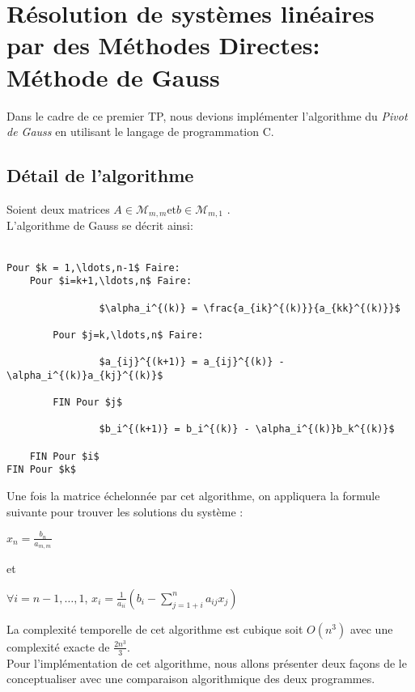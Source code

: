 \chapter{Résolution de systèmes linéaires par des Méthodes Directes: Méthode de Gauss}
Dans le cadre de ce premier TP, nous devions implémenter l'algorithme du \emph{Pivot de Gauss} en utilisant le langage de programmation C.
\section{Détail de l'algorithme}
Soient deux matrices $A \in \mathcal{M}_{m,m} \text{et} b \in \mathcal{M}_{m,1}$ . \\
L'algorithme de Gauss se décrit ainsi: \\ \\
\begin{lstlisting}[mathescape=true, frame=single]
Pour $k = 1,\ldots,n-1$ Faire:
	Pour $i=k+1,\ldots,n$ Faire:

				$\alpha_i^{(k)} = \frac{a_{ik}^{(k)}}{a_{kk}^{(k)}}$ 
		
		Pour $j=k,\ldots,n$ Faire:

		   		$a_{ij}^{(k+1)} = a_{ij}^{(k)} - \alpha_i^{(k)}a_{kj}^{(k)}$
	
		FIN Pour $j$

				$b_i^{(k+1)} = b_i^{(k)} - \alpha_i^{(k)}b_k^{(k)}$

	FIN Pour $i$
FIN Pour $k$
\end{lstlisting}
\newpage
Une fois la matrice échelonnée par cet algorithme, on appliquera la formule suivante pour trouver les solutions du système : \\
\begin{center}
\begin{large}
$ x_n = \frac{b_n}{a_{m,m}}$ \\
\end{large}
\end{center}
et \\
\begin{center}
\begin{large}
$ \forall i = n-1, \ldots, 1$, $x_i = \frac{1}{a_{ii}}\left( b_i-\sum\limits_{j=1+i}^n a_{ij}x_j \right)$\\
\end{large}
\end{center}
La complexité temporelle de cet algorithme est cubique soit $O(n^3)$ avec une complexité exacte de $\frac{2n^3}{3}$. \\
Pour l'implémentation de cet algorithme, nous allons présenter deux façons de le conceptualiser avec une comparaison algorithmique des deux programmes. \\
